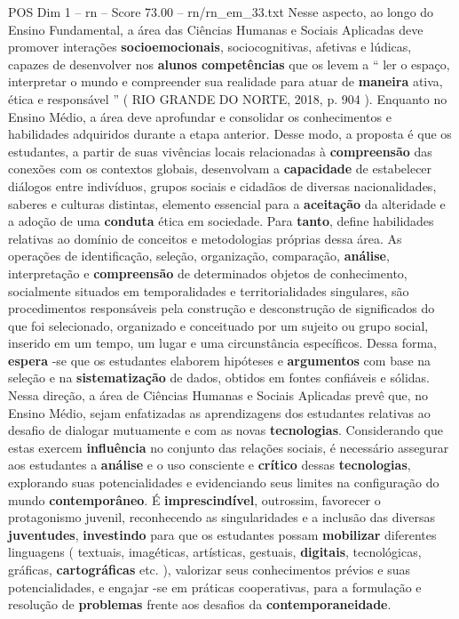 \begin{textsample}{POS Dim 1 – rn – Score 73.00 – rn/rn\_em\_33.txt}  \label{ex:f1_pos_261}
Nesse aspecto, ao longo do Ensino Fundamental, a área das Ciências Humanas e Sociais Aplicadas deve promover interações \textbf{socioemocionais}, sociocognitivas, afetivas e lúdicas, capazes de desenvolver nos \textbf{alunos} \textbf{competências} que os levem a “ ler o espaço, interpretar o mundo e compreender sua realidade para atuar de \textbf{maneira} ativa, ética e responsável ” ( RIO GRANDE DO NORTE, 2018, p. 904 ).
Enquanto no Ensino Médio, a área deve aprofundar e consolidar os conhecimentos e habilidades adquiridos durante a etapa anterior.
Desse modo, a proposta é que os estudantes, a partir de suas vivências locais relacionadas à \textbf{compreensão} das conexões com os contextos globais, desenvolvam a \textbf{capacidade} de estabelecer diálogos entre indivíduos, grupos sociais e cidadãos de diversas nacionalidades, saberes e culturas distintas, elemento essencial para a \textbf{aceitação} da alteridade e a adoção de uma \textbf{conduta} ética em sociedade.
Para \textbf{tanto}, define habilidades relativas ao domínio de conceitos e metodologias próprias dessa área.
As operações de identificação, seleção, organização, comparação, \textbf{análise}, interpretação e \textbf{compreensão} de determinados objetos de conhecimento, socialmente situados em temporalidades e territorialidades singulares, são procedimentos responsáveis pela construção e desconstrução de significados do que foi selecionado, organizado e conceituado por um sujeito ou grupo social, inserido em um tempo, um lugar e uma circunstância específicos.
Dessa forma, \textbf{espera} -se que os estudantes elaborem hipóteses e \textbf{argumentos} com base na seleção e na \textbf{sistematização} de dados, obtidos em fontes confiáveis e sólidas.
Nessa direção, a área de Ciências Humanas e Sociais Aplicadas prevê que, no Ensino Médio, sejam enfatizadas as aprendizagens dos estudantes relativas ao desafio de dialogar mutuamente e com as novas \textbf{tecnologias}.
Considerando que estas exercem \textbf{influência} no conjunto das relações sociais, é necessário assegurar aos estudantes a \textbf{análise} e o uso consciente e \textbf{crítico} dessas \textbf{tecnologias}, explorando suas potencialidades e evidenciando seus limites na configuração do mundo \textbf{contemporâneo}.
É \textbf{imprescindível}, outrossim, favorecer o protagonismo juvenil, reconhecendo as singularidades e a inclusão das diversas \textbf{juventudes}, \textbf{investindo} para que os estudantes possam \textbf{mobilizar} diferentes linguagens ( textuais, imagéticas, artísticas, gestuais, \textbf{digitais}, tecnológicas, gráficas, \textbf{cartográficas} etc. ), valorizar seus conhecimentos prévios e suas potencialidades, e engajar -se em práticas cooperativas, para a formulação e resolução de \textbf{problemas} frente aos desafios da \textbf{contemporaneidade}.

\end{textsample}
